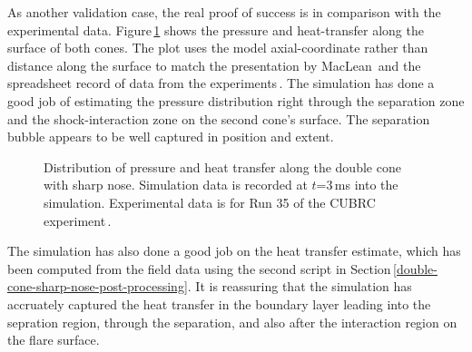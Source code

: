 \medskip
As another validation case, the real proof of success is in comparison with the experimental data.
Figure\,\ref{fig:double-cone-sharp-nose-plate-data-compare} shows the pressure and heat-transfer
along the surface of both cones.
The plot uses the model axial-coordinate rather than distance along the surface
to match the presentation by MacLean\,\cite{maclean_holden_2004a} and 
the spreadsheet record of data from
the experiments\,\cite{holden_etal_2002a,holden_wadhams_2003a}.
The simulation has done a good job of estimating the pressure distribution right 
through the separation zone and the shock-interaction zone on the second cone's surface.
The separation bubble appears to be well captured in position and extent.

\begin{figure}[htb]
 \centering
 \caption{Distribution of pressure and heat transfer along the double cone with sharp nose.
   Simulation data is recorded at $t$=3\,ms into the simulation.
   Experimental data is for Run 35 of the CUBRC experiment\,\cite{holden_etal_2002a}.}
 \label{fig:double-cone-sharp-nose-plate-data-compare}
\end{figure}

\medskip
The simulation has also done a good job on the heat transfer estimate,
which has been computed from the field data using the second script 
in Section\,\ref{double-cone-sharp-nose-post-processing}.
It is reassuring that the simulation has accruately captured the heat transfer
in the boundary layer leading into the sepration region,
through the separation, and also after the interaction region on the flare surface.

